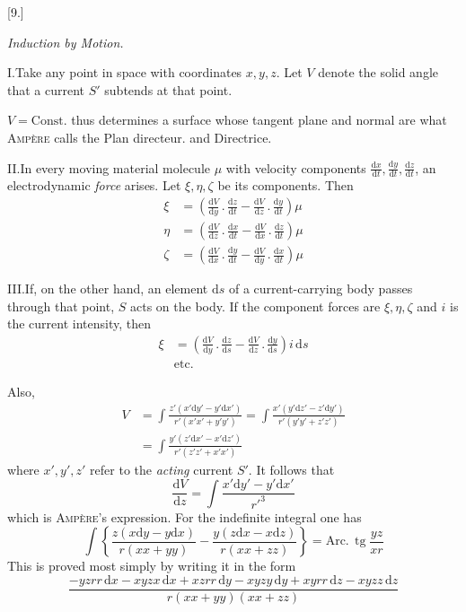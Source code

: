 \begin{center}[9.]\par\medskip\textit{Induction by Motion.}\end{center}
I.\quad Take any point in space with coordinates $x,y,z$. Let $V$ denote the solid angle that a current $S'$ subtends at that point.

$V=\text{Const.}$ thus determines a surface whose tangent plane and normal are what \textsc{Ampère} calls the Plan directeur. and Directrice.

II.\quad In every moving material molecule $\mu$ with velocity components $\frac{\mathrm dx}{\mathrm dt},\frac{\mathrm dy}{\mathrm dt},\frac{\mathrm dz}{\mathrm dt}$, an electrodynamic \textit{force} arises. Let $\xi,\eta,\zeta$ be its components. Then
\[
\begin{aligned}
\xi&=\left(\frac{\mathrm dV}{\mathrm dy}\,.\,\frac{\mathrm dz}{\mathrm dt}-\frac{\mathrm dV}{\mathrm dz}\,.\,\frac{\mathrm dy}{\mathrm dt}\right)\mu\\[4pt]
\eta&=\left(\frac{\mathrm dV}{\mathrm dz}\,.\,\frac{\mathrm dx}{\mathrm dt}-\frac{\mathrm dV}{\mathrm dx}\,.\,\frac{\mathrm dz}{\mathrm dt}\right)\mu\\[4pt]
\zeta&=\left(\frac{\mathrm dV}{\mathrm dx}\,.\,\frac{\mathrm dy}{\mathrm dt}-\frac{\mathrm dV}{\mathrm dy}\,.\,\frac{\mathrm dx}{\mathrm dt}\right)\mu
\end{aligned}
\]

III.\quad If, on the other hand, an element $\mathrm ds$ of a current-carrying body passes through that point, $S$ acts on the body. If the component forces are $\xi,\eta,\zeta$ and $i$ is the current intensity, then
\[
\begin{aligned}
\xi&=\left(\frac{\mathrm dV}{\mathrm dy}\,.\,\frac{\mathrm dz}{\mathrm ds}-\frac{\mathrm dV}{\mathrm dz}\,.\,\frac{\mathrm dy}{\mathrm ds}\right)i\,\mathrm ds\\
&\text{etc.}
\end{aligned}
\]

Also,
\[
\begin{aligned}
V&=\int\frac{z'(x'\mathrm dy'-y'\mathrm dx')}{r'(x'x'+y'y')}=\int\frac{x'(y'\mathrm dz'-z'\mathrm dy')}{r'(y'y'+z'z')}\\
&=\int\frac{y'(z'\mathrm dx'-x'\mathrm dz')}{r'(z'z'+x'x')}
\end{aligned}
\]
where $x',y',z'$ refer to the \textit{acting} current $S'$. It follows that
\[
\frac{\mathrm dV}{\mathrm dz}=\int\frac{x'\mathrm dy'-y'\mathrm dx'}{r'^3}
\]
which is \textsc{Ampère}’s expression. For the indefinite integral one has
\[
\int\left\{\frac{z(x\mathrm dy-y\mathrm dx)}{r(xx+yy)}-\frac{y(z\mathrm dx-x\mathrm dz)}{r(xx+zz)}\right\}=\text{Arc.}\,\operatorname{tg}\frac{yz}{xr}
\]
This is proved most simply by writing it in the form
\[
\frac{-yzrr\,\mathrm dx-xyzx\,\mathrm dx+xzrr\,\mathrm dy-xyzy\,\mathrm dy+xyrr\,\mathrm dz-xyzz\,\mathrm dz}{r(xx+yy)(xx+zz)}
\]

